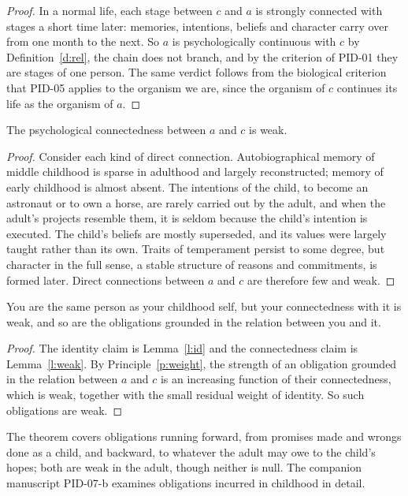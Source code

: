 \documentclass{situationist-preprint}
\begin{document}
\begin{proof}
In a normal life, each stage between $c$ and $a$ is strongly connected with stages a short time later: memories, intentions, beliefs and character carry over from one month to the next. So $a$ is psychologically continuous with $c$ by Definition~\ref{d:rel}, the chain does not branch, and by the criterion of PID-01 they are stages of one person. The same verdict follows from the biological criterion that PID-05 applies to the organism we are, since the organism of $c$ continues its life as the organism of $a$.
\end{proof}

\begin{lemma}\label{l:weak}
The psychological connectedness between $a$ and $c$ is weak.
\end{lemma}

\begin{proof}
Consider each kind of direct connection. Autobiographical memory of middle childhood is sparse in adulthood and largely reconstructed; memory of early childhood is almost absent. The intentions of the child, to become an astronaut or to own a horse, are rarely carried out by the adult, and when the adult's projects resemble them, it is seldom because the child's intention is executed. The child's beliefs are mostly superseded, and its values were largely taught rather than its own. Traits of temperament persist to some degree, but character in the full sense, a stable structure of reasons and commitments, is formed later. Direct connections between $a$ and $c$ are therefore few and weak.
\end{proof}

\begin{theorem}\label{t:main}
You are the same person as your childhood self, but your connectedness with it is weak, and so are the obligations grounded in the relation between you and it.
\end{theorem}

\begin{proof}
The identity claim is Lemma~\ref{l:id} and the connectedness claim is Lemma~\ref{l:weak}. By Principle~\ref{p:weight}, the strength of an obligation grounded in the relation between $a$ and $c$ is an increasing function of their connectedness, which is weak, together with the small residual weight of identity. So such obligations are weak.
\end{proof}

The theorem covers obligations running forward, from promises made and wrongs done as a child, and backward, to whatever the adult may owe to the child's hopes; both are weak in the adult, though neither is null. The companion manuscript PID-07-b examines obligations incurred in childhood in detail.
\end{document}
